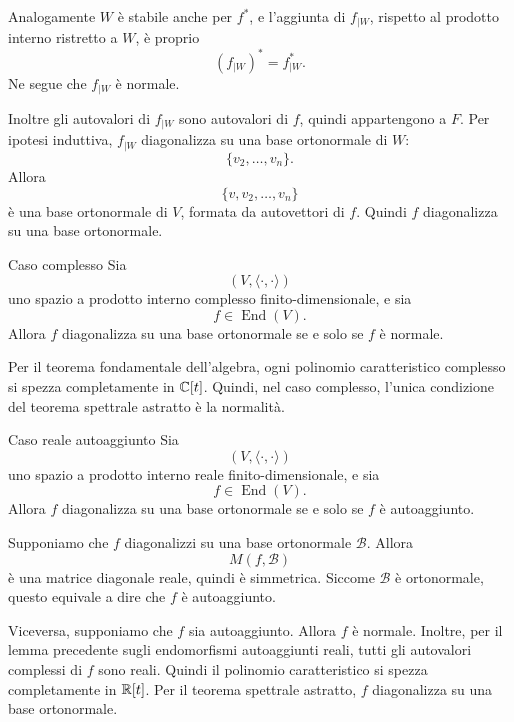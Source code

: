 \documentclass[a4paper]{article}
\begin{document}
\begin{snippetproof}{}
    Analogamente \(W\) è stabile anche per \(f^*\), e l'aggiunta di \(f_{\mid W}\), rispetto al prodotto interno ristretto a \(W\), è proprio
    \[
        (f_{\mid W})^*=f^*_{\mid W}.
    \]
    Ne segue che \(f_{\mid W}\) è normale.

    Inoltre gli autovalori di \(f_{\mid W}\) sono autovalori di \(f\), quindi appartengono a \(F\). Per ipotesi induttiva, \(f_{\mid W}\) diagonalizza su una base ortonormale di \(W\):
    \[
        \{v_2,\ldots,v_n\}.
    \]
    Allora
    \[
        \{v,v_2,\ldots,v_n\}
    \]
    è una base ortonormale di \(V\), formata da autovettori di \(f\). Quindi \(f\) diagonalizza su una base ortonormale.
\end{snippetproof}

\begin{snippetcorollary}{Caso complesso}
    Sia
    \[
        (V,\langle\cdot,\cdot\rangle)
    \]
    uno spazio a prodotto interno complesso finito-dimensionale, e sia
    \[
        f\in\operatorname{End}(V).
    \]
    Allora \(f\) diagonalizza su una base ortonormale se e solo se \(f\) è normale.
\end{snippetcorollary}

\begin{snippetproof}{}
    Per il teorema fondamentale dell'algebra, ogni polinomio caratteristico complesso si spezza completamente in \(\mathbb{C}[t]\). Quindi, nel caso complesso, l'unica condizione del teorema spettrale astratto è la normalità.
\end{snippetproof}

\begin{snippetcorollary}{Caso reale autoaggiunto}
    Sia
    \[
        (V,\langle\cdot,\cdot\rangle)
    \]
    uno spazio a prodotto interno reale finito-dimensionale, e sia
    \[
        f\in\operatorname{End}(V).
    \]
    Allora \(f\) diagonalizza su una base ortonormale se e solo se \(f\) è autoaggiunto.
\end{snippetcorollary}

\begin{snippetproof}{}
    Supponiamo che \(f\) diagonalizzi su una base ortonormale \(\mathcal{B}\). Allora
    \[
        M(f,\mathcal{B})
    \]
    è una matrice diagonale reale, quindi è simmetrica. Siccome \(\mathcal{B}\) è ortonormale, questo equivale a dire che \(f\) è autoaggiunto.

    Viceversa, supponiamo che \(f\) sia autoaggiunto. Allora \(f\) è normale. Inoltre, per il lemma precedente sugli endomorfismi autoaggiunti reali, tutti gli autovalori complessi di \(f\) sono reali. Quindi il polinomio caratteristico si spezza completamente in \(\mathbb{R}[t]\). Per il teorema spettrale astratto, \(f\) diagonalizza su una base ortonormale.
\end{snippetproof}
\end{document}
